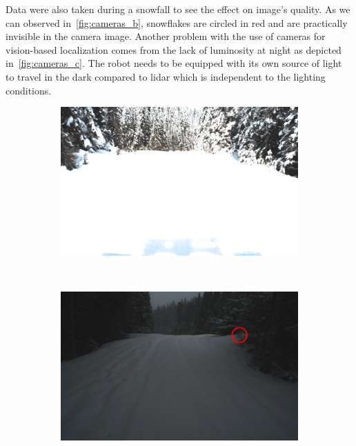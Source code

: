 Data were also taken during a snowfall to see the effect on image's quality. As we can observed in~\autoref{fig:cameras_b}, snowflakes are circled in red and are practically invisible in the camera image. Another problem with the use of cameras for vision-based localization comes from the lack of luminosity at night as depicted in~\autoref{fig:cameras_c}. The robot needs to be equipped with its own source of light to travel in the dark compared to lidar which is independent to the lighting conditions.

\begin{figure}[htpb]
	\begin{center}
		\begin{subfigure}[b]{0.32\textwidth}
			\includegraphics[width=\linewidth]{figs/camera/figure_camera_teachA_top.pdf}
		\end{subfigure}%
		~
		\begin{subfigure}[b]{0.32\textwidth}
			\includegraphics[width=\linewidth]{figs/camera/figure_camera_run9_top.pdf}

\end{subfigure}
\end{center}
\end{figure}
